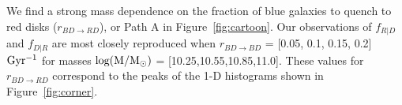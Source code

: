 \documentclass[useAMS,usenatbib]{mn2e}
\begin{document}
We find a strong mass dependence on the fraction of blue galaxies to quench to red disks ($r_{BD \rightarrow RD}$), or Path A in Figure~\ref{fig:cartoon}. Our observations of $f_{R|D}$ and $f_{D|R}$ are most closely reproduced when $r_{BD \rightarrow BD}$ = [0.05, 0.1, 0.15, 0.2] $\rm Gyr^{-1}$ for masses $\rm log(M/M_{\odot})$ = [10.25,10.55,10.85,11.0]. These values for $r_{BD \rightarrow RD}$ correspond to the peaks of the 1-D histograms shown in Figure~\ref{fig:corner}. 

%
%
%
%
%
%
%
%
%
%
%
 
\end{document}
